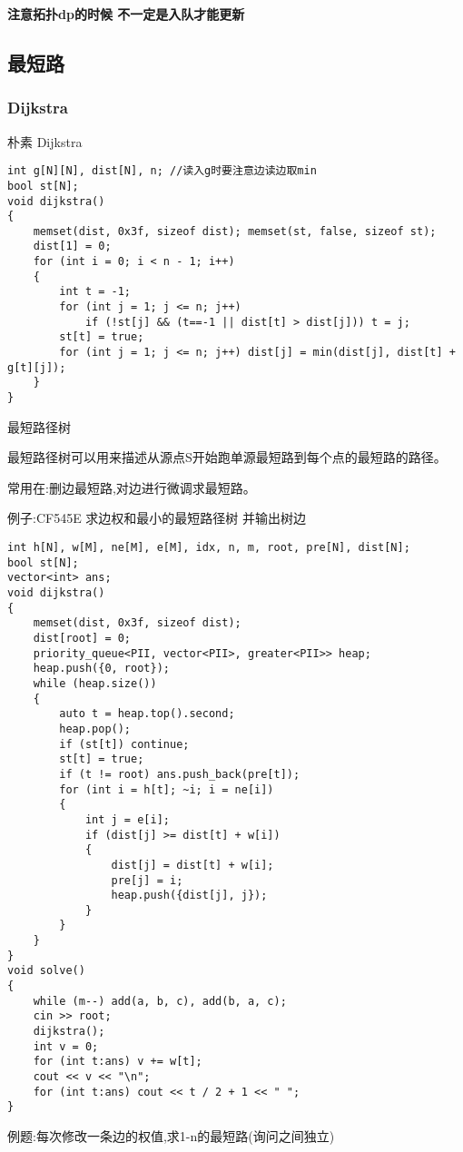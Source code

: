 \documentclass[a4paper,fontset=none]{ctexart}
\begin{document}
\textbf{注意拓扑dp的时候 不一定是入队才能更新}
\subsection{最短路}
\subsubsection{Dijkstra}
朴素 Dijkstra
\begin{verbatim}
int g[N][N], dist[N], n; //读入g时要注意边读边取min
bool st[N];
void dijkstra()
{
    memset(dist, 0x3f, sizeof dist); memset(st, false, sizeof st);
    dist[1] = 0;
    for (int i = 0; i < n - 1; i++)
    {
        int t = -1;
        for (int j = 1; j <= n; j++)
            if (!st[j] && (t==-1 || dist[t] > dist[j])) t = j;
        st[t] = true;
        for (int j = 1; j <= n; j++) dist[j] = min(dist[j], dist[t] + g[t][j]);
    }
}
\end{verbatim}

最短路径树

最短路径树可以用来描述从源点S开始跑单源最短路到每个点的最短路的路径。

常用在:删边最短路,对边进行微调求最短路。

例子:CF545E   求边权和最小的最短路径树 并输出树边

\begin{verbatim}
int h[N], w[M], ne[M], e[M], idx, n, m, root, pre[N], dist[N];
bool st[N];
vector<int> ans;
void dijkstra()
{
    memset(dist, 0x3f, sizeof dist);
    dist[root] = 0;
    priority_queue<PII, vector<PII>, greater<PII>> heap;
    heap.push({0, root});
    while (heap.size())
    {
        auto t = heap.top().second;
        heap.pop();
        if (st[t]) continue;
        st[t] = true;
        if (t != root) ans.push_back(pre[t]);
        for (int i = h[t]; ~i; i = ne[i])
        {
            int j = e[i];
            if (dist[j] >= dist[t] + w[i])
            {
                dist[j] = dist[t] + w[i];
                pre[j] = i;
                heap.push({dist[j], j});
            }
        }
    }
}
void solve()
{
    while (m--) add(a, b, c), add(b, a, c);
    cin >> root;
    dijkstra();
    int v = 0;
    for (int t:ans) v += w[t];
    cout << v << "\n";
    for (int t:ans) cout << t / 2 + 1 << " ";
}
\end{verbatim}

例题:每次修改一条边的权值,求1-n的最短路(询问之间独立)
\end{document}
